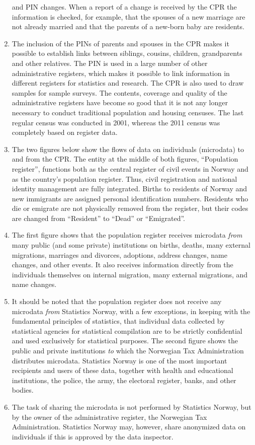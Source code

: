 \documentclass[
]{article}
\begin{document}
\begin{enumerate}
  and PIN changes. When a report of a change is received by the CPR
  the information is checked, for example, that the spouses of a new
  marriage are not already married and that the parents of a new-born
  baby are residents.
\item
  The inclusion of the PINs of parents and spouses in the CPR makes
  it possible to establish links between siblings, cousins, children,
  grandparents and other relatives. The PIN is used in a large number
  of other administrative registers, which makes it possible to link
  information in different registers for statistics and research. The
  CPR is also used to draw samples for sample surveys. The contents,
  coverage and quality of the administrative registers have become so
  good that it is not any longer necessary to conduct traditional
  population and housing censuses. The last regular census was
  conducted in 2001, whereas the 2011 census was completely based on
  register data.
\item
  The two figures below show the flows of data on individuals
  (microdata) to and from the CPR. The entity at the middle of both
  figures, ``Population register'', functions both as the central
  register of civil events in Norway and as the country's population
  register. Thus, civil registration and national identity management
  are fully integrated. Births to residents of Norway and new
  immigrants are assigned personal identification numbers. Residents
  who die or emigrate are not physically removed from the register,
  but their codes are changed from ``Resident'' to ``Dead'' or
  ``Emigrated''.
\item
  The first figure shows that the population register receives
  microdata \emph{from} many public (and some private) institutions on
  births, deaths, many external migrations, marriages and divorces,
  adoptions, address changes, name changes, and other events. It also
  receives information directly from the individuals themselves on
  internal migration, many external migrations, and name changes.
\item
  It should be noted that the population register does not receive
  any microdata \emph{from} Statistics Norway, with a few exceptions, in
  keeping with the fundamental principles of statistics, that
  individual data collected by statistical agencies for statistical
  compilation are to be strictly confidential and used exclusively for
  statistical purposes. The second figure shows the public and private
  institutions \emph{to} which the Norwegian Tax Administration distributes
  microdata. Statistics Norway is one of the most important recipients
  and users of these data, together with health and educational
  institutions, the police, the army, the electoral register, banks,
  and other bodies.
\item
  The task of sharing the microdata is not performed by Statistics
  Norway, but by the owner of the administrative register, the
  Norwegian Tax Administration. Statistics Norway may, however, share
  anonymized data on individuals if this is approved by the data
  inspector.
\end{enumerate}
\end{document}
